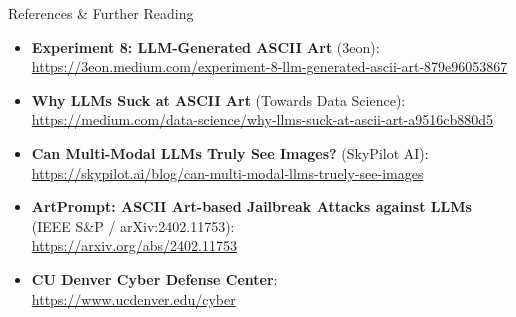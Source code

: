 \documentclass[aspectratio=169,11pt,xcolor={table,dvipsnames}]{beamer}
\begin{document}
\begin{frame}{References \& Further Reading}
  \begin{itemize}
    \item \textbf{Experiment 8: LLM-Generated ASCII Art} (3eon): \\
      \footnotesize\url{https://3eon.medium.com/experiment-8-llm-generated-ascii-art-879e96053867}
    \item \textbf{Why LLMs Suck at ASCII Art} (Towards Data Science): \\
      \footnotesize\url{https://medium.com/data-science/why-llms-suck-at-ascii-art-a9516cb880d5}
    \item \textbf{Can Multi-Modal LLMs Truly See Images?} (SkyPilot AI): \\
      \footnotesize\url{https://skypilot.ai/blog/can-multi-modal-llms-truely-see-images}
    \item \textbf{ArtPrompt: ASCII Art-based Jailbreak Attacks against LLMs} (IEEE S\&P / arXiv:2402.11753): \\
      \footnotesize\url{https://arxiv.org/abs/2402.11753}
    \item \textbf{CU Denver Cyber Defense Center}: \\
      \footnotesize\url{https://www.ucdenver.edu/cyber}
  \end{itemize}
\end{frame}
\end{document}
